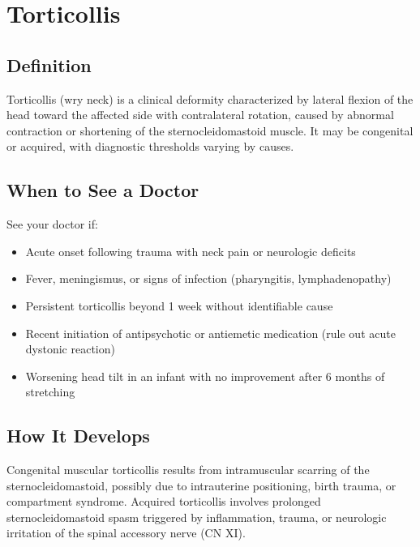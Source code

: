 \chapter{Torticollis}

\section*{Definition}
Torticollis (wry neck) is a clinical deformity characterized by lateral flexion of the head toward the affected side with contralateral rotation, caused by abnormal contraction or shortening of the sternocleidomastoid muscle. It may be congenital or acquired, with diagnostic thresholds varying by causes.

\section*{When to See a Doctor}
See your doctor if:
\begin{itemize}
  \item Acute onset following trauma with neck pain or neurologic deficits
  \item Fever, meningismus, or signs of infection (pharyngitis, lymphadenopathy)
  \item Persistent torticollis beyond 1 week without identifiable cause
  \item Recent initiation of antipsychotic or antiemetic medication (rule out acute dystonic reaction)
  \item Worsening head tilt in an infant with no improvement after 6 months of stretching
\end{itemize}

\section*{How It Develops}
Congenital muscular torticollis results from intramuscular scarring of the sternocleidomastoid, possibly due to intrauterine positioning, birth trauma, or compartment syndrome. Acquired torticollis involves prolonged sternocleidomastoid spasm triggered by inflammation, trauma, or neurologic irritation of the spinal accessory nerve (CN XI).

